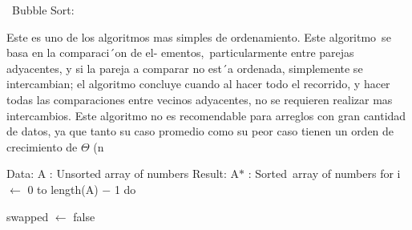 \documentclass[12pt]{article}
\begin{document}
\vspace{\baselineskip}

\vspace{\baselineskip}
\begin{adjustwidth}{0.07in}{5.67in}
\begin{justify}
{\fontsize{14pt}{16.8pt}\   Bubble  Sort:\par}
\end{justify}\par

\end{adjustwidth}


\vspace{\baselineskip}
\begin{adjustwidth}{0.07in}{0.04in}
\begin{justify}
{\fontsize{11pt}{13.2pt}\selectfont Este es uno de los algoritmos mas simples de ordenamiento. Este algoritmo\  se basa en la comparaci´on de el- ementos,\  particularmente entre parejas adyacentes, y si la pareja a comparar no est´a ordenada, simplemente se intercambian; el algoritmo  concluye cuando  al hacer  todo el recorrido,  y hacer  todas  las comparaciones entre  vecinos adyacentes, no se requieren  realizar  mas  intercambios.  Este  algoritmo  no es recomendable para arreglos con gran cantidad de datos,  ya que tanto su caso promedio como su peor caso tienen un orden de crecimiento  de $ \Theta $ (n{\fontsize{8pt}{9.6pt}\par}\par}
\end{justify}\par

\end{adjustwidth}


\vspace{\baselineskip}
\begin{adjustwidth}{0.31in}{4.32in}
\begin{justify}
{\fontsize{11pt}{13.2pt}\selectfont Data: A : Unsorted  array  of numbers Result: A$\ast$  : Sorted\  array  of numbers for  i $ \leftarrow $  0 to length(A) $-$  1 do\par}
\end{justify}\par

\end{adjustwidth}

\begin{adjustwidth}{0.54in}{0.0in}
{\fontsize{11pt}{13.2pt}\selectfont swapped  $ \leftarrow $  false\par}\par

\end{adjustwidth}
\end{document}
